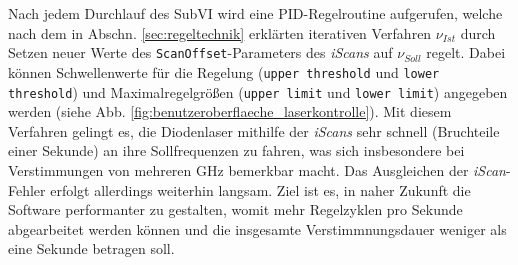 Nach jedem Durchlauf des SubVI wird eine PID-Regelroutine aufgerufen, welche
nach dem in Abschn. \ref{sec:regeltechnik} erklärten iterativen Verfahren
$\nu_{Ist}$ durch Setzen neuer Werte des
\lstinline|ScanOffset|-Parameters des \textit{iScans} auf $\nu_{Soll}$ regelt.
Dabei können Schwellenwerte für die Regelung (\lstinline|upper threshold| und
\lstinline|lower threshold|) und Maximalregelgrößen (\lstinline|upper limit| und
\lstinline|lower limit|) angegeben werden (siehe Abb.
\ref{fig:benutzeroberflaeche_laserkontrolle}). Mit diesem Verfahren gelingt es,
die Diodenlaser mithilfe der \textit{iScans} sehr schnell (Bruchteile einer
Sekunde) an ihre Sollfrequenzen zu fahren, was sich insbesondere bei
Verstimmungen von mehreren GHz bemerkbar macht. Das Ausgleichen der
\textit{iScan}-Fehler erfolgt allerdings weiterhin langsam. Ziel ist es,
in naher Zukunft die Software performanter zu gestalten, womit mehr
Regelzyklen pro Sekunde abgearbeitet werden können und die insgesamte
Verstimmnungsdauer weniger als eine Sekunde betragen soll.

